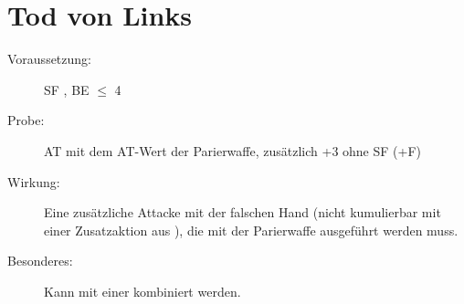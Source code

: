 \section{Tod von Links}
\label{aktion.tod_von_links}
\begin{description}
    \item[Voraussetzung:]
        SF , BE\textrm{ ${\leq}$ }4
    \item[Probe:]
        AT mit dem AT-Wert der Parierwaffe, zusätzlich +3 ohne SF  (+F)
    \item[Wirkung:]
        Eine zusätzliche Attacke mit der falschen Hand (nicht kumulierbar mit einer Zusatzaktion aus ), die mit der Parierwaffe ausgeführt werden muss.
    \item[Besonderes:]
        Kann mit einer  kombiniert werden.
\end{description}
